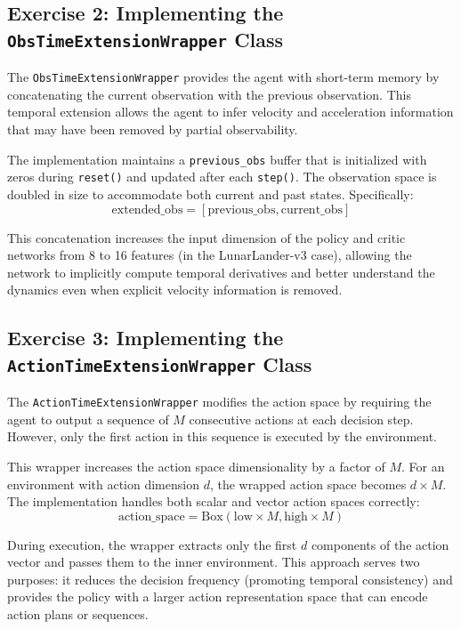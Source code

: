 \documentclass[12pt, a4paper]{article}
\begin{document}
\subsection{Exercise 2: Implementing the \texttt{ObsTimeExtensionWrapper} Class}

The \texttt{ObsTimeExtensionWrapper} provides the agent with short-term memory by concatenating the current observation with the previous observation. This temporal extension allows the agent to infer velocity and acceleration information that may have been removed by partial observability.

The implementation maintains a \texttt{previous\_obs} buffer that is initialized with zeros during \texttt{reset()} and updated after each \texttt{step()}. The observation space is doubled in size to accommodate both current and past states. Specifically:
\[
\text{extended\_obs} = [\text{previous\_obs}, \text{current\_obs}]
\]

This concatenation increases the input dimension of the policy and critic networks from 8 to 16 features (in the LunarLander-v3 case), allowing the network to implicitly compute temporal derivatives and better understand the dynamics even when explicit velocity information is removed.

\subsection{Exercise 3: Implementing the \texttt{ActionTimeExtensionWrapper} Class}

The \texttt{ActionTimeExtensionWrapper} modifies the action space by requiring the agent to output a sequence of $M$ consecutive actions at each decision step. However, only the first action in this sequence is executed by the environment.

This wrapper increases the action space dimensionality by a factor of $M$. For an environment with action dimension $d$, the wrapped action space becomes $d \times M$. The implementation handles both scalar and vector action spaces correctly:
\[
\text{action\_space} = \text{Box}(\text{low} \times M, \text{high} \times M)
\]

During execution, the wrapper extracts only the first $d$ components of the action vector and passes them to the inner environment. This approach serves two purposes: it reduces the decision frequency (promoting temporal consistency) and provides the policy with a larger action representation space that can encode action plans or sequences.
\end{document}
